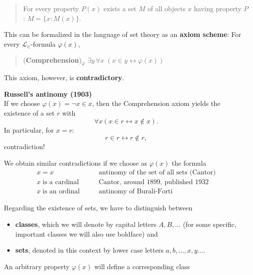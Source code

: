 \documentclass{article}
\begin{document}
\begin{quote}
For every property $P(x)$ exists a set $M$ of all objects $x$ having property $P$:  $M =\{x: M(x) \}$.
\end{quote}

This can be formalized in the language of set theory as an \textbf{axiom scheme}: For every $\mathcal{L}_\in$-formula $\varphi(x)$,

\begin{quote}
(\textbf{Comprehension})\textsubscript{$\varphi$} $\exists y \, \forall x \; ( x \in y \leftrightarrow \varphi(x))$
\end{quote}

This axiom, however, is \textbf{contradictory}.

\begin{framed}
\textbf{Russell's antinomy (1903)}\\
If we choose $\varphi(x) = \neg x \in x$, then the Comprehension axiom yields the existence of a set $r$ with
\begin{equation*}
\forall x ( x \in  r \leftrightarrow x \not \in x).
\end{equation*}
In particular, for $x = r$:
\begin{equation*}
r \in  r \leftrightarrow r \not \in r ,
\end{equation*}
contradiction!
\end{framed}

We obtain similar contradictions if we choose as $\varphi(x)$ the formula
\begin{align*}
     x = x  \qquad &  \text{antinomy of the set of all sets (Cantor)} \\
     x\;\text{is a cardinal} \qquad & \text{Cantor, around 1899, published 1932}\\
     x \; \text{is an ordinal} \qquad &   \text{antinomy of Burali-Forti}
\end{align*}

Regarding the existence of sets, we have to distinguish between

\begin{itemize}
\item \textbf{classes}, which we will denote by capital letters $A,B,\dots$ (for some specific, important classes we will also use boldface) and
\item \textbf{sets}, denoted in this context by lower case letters $a,b,\ldots,x,y \ldots$.
\end{itemize}

An arbitrary property $\varphi(x)$ will define a corresponding class
\end{document}
